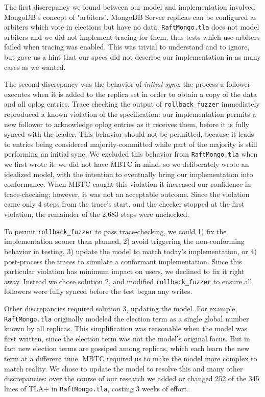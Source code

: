 \documentclass{vldb}
\begin{document}
The first discrepancy we found between our model and implementation involved MongoDB's concept of "arbiters".
MongoDB Server replicas can be configured as arbiters which vote in elections but have no data. 
\texttt{RaftMongo.tla} does not model arbiters and we did not implement tracing for them, thus tests which use arbiters failed when tracing was enabled.
This was trivial to understand and to ignore, but gave us a hint that our specs did not describe our implementation in as many cases as we wanted.

The second discrepancy was the behavior of \textit{initial sync}, the process a follower executes when it is added to the replica set in order to obtain a copy of the data and all oplog entries.
Trace checking the output of \texttt{rollback\_fuzzer} immediately reproduced a known violation \cite{SERVER-17934} of the specification: our implementation permits a new follower to acknowledge oplog entries as it receives them, before it is fully synced with the leader.
This behavior should not be permitted, because it leads to entries being considered majority-committed while part of the majority is still performing an initial sync.
We excluded this behavior from \texttt{RaftMongo.tla} when we first wrote it:
we did not have MBTC in mind, so we deliberately wrote an idealized model, with the intention to eventually bring our implementation into conformance.
When MBTC caught this violation it increased our confidence in trace-checking; however, it was not an acceptable outcome. 
Since the violation came only 4 steps from the trace's start, and the checker stopped at the first violation, the remainder of the 2,683 steps were unchecked. 

To permit \texttt{rollback\_fuzzer} to pass trace-checking, we could 1) fix the implementation sooner than planned, 2) avoid triggering the non-conforming behavior in testing, 3) update the model to match today's implementation, or 4) post-process the traces to simulate a conformant implementation.
Since this particular violation has minimum impact on users, we declined to fix it right away.
Instead we chose solution 2, and modified \texttt{rollback\_fuzzer} to ensure all followers were fully synced before the test began any writes. 

Other discrepancies required solution 3, updating the model. 
For example, \texttt{RaftMongo.tla} originally modeled the election term as a single global number known by all replicas.
This simplification was reasonable when the model was first written, since the election term was not the model's original focus. 
But in fact new election terms are gossiped among replicas, which each learn the new term at a different time.
MBTC required us to make the model more complex to match reality. 
We chose to update the model to resolve this and many other discrepancies: over the course of our research we added or changed 252 of the 345 lines of TLA+ in \texttt{RaftMongo.tla}, costing 3 weeks of effort.
\end{document}

